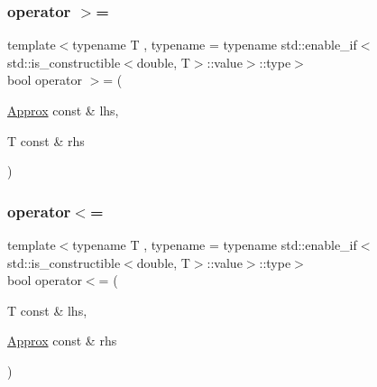 \subsubsection{\texorpdfstring{operator $>$=}{operator >=}\hspace{0.1cm}{\footnotesize\ttfamily [2/2]}}
{\footnotesize\ttfamily template$<$typename T , typename  = typename std\+::enable\+\_\+if$<$std\+::is\+\_\+constructible$<$double, T$>$\+::value$>$\+::type$>$ \\
bool operator $>$= (\begin{DoxyParamCaption}\item[{\mbox{\hyperlink{class_catch_1_1_detail_1_1_approx}{Approx}} const \&}]{lhs,  }\item[{T const \&}]{rhs }\end{DoxyParamCaption})\hspace{0.3cm}{\ttfamily [friend]}}

\mbox{\label{class_catch_1_1_detail_1_1_approx_a0369de03e81bc2ceaf6c9d830476bd49}} 
\subsubsection{\texorpdfstring{operator$<$=}{operator<=}\hspace{0.1cm}{\footnotesize\ttfamily [1/2]}}
{\footnotesize\ttfamily template$<$typename T , typename  = typename std\+::enable\+\_\+if$<$std\+::is\+\_\+constructible$<$double, T$>$\+::value$>$\+::type$>$ \\
bool operator$<$= (\begin{DoxyParamCaption}\item[{T const \&}]{lhs,  }\item[{\mbox{\hyperlink{class_catch_1_1_detail_1_1_approx}{Approx}} const \&}]{rhs }\end{DoxyParamCaption})\hspace{0.3cm}{\ttfamily [friend]}}

\mbox{\label{class_catch_1_1_detail_1_1_approx_a6040b908588745570847d7ae8483b091}} 
